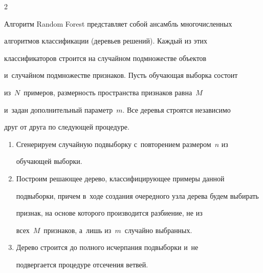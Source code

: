 \begin{multicols}{2}
\begin{itemize}
\end{itemize}

  

  Алгоритм Random Forest представляет собой ансамбль многочисленных 

алгоритмов классификации (деревьев решений). Каждый из этих 

классификаторов строится на случайном подмножестве объектов 

и~случайном подмножестве признаков. Пусть обучающая выборка состоит 

из~$N$~примеров, размерность пространства признаков равна~$M$ 

и~задан дополнительный параметр~$m$. Все деревья строятся независимо 

друг от друга по следующей процедуре.

  \begin{enumerate}[1.]

  \item Сгенерируем случайную подвыборку с~повторением размером~$n$ из 

обучающей выборки.

  \item Построим решающее дерево, классифицирующее примеры данной 

подвыборки, причем в~ходе создания очередного узла дерева будем выбирать 

признак, на основе которого производится разбиение, не из 

всех~$M$~признаков, а~лишь из~$m$~случайно выбранных.

  \item Дерево строится до полного исчерпания подвыборки и~не 

подвергается процедуре отсечения ветвей.

  \end{enumerate}

  

     \begin{table}[b]\small %

  \begin{center}


  \vspace*{2ex}

  

  \begin{tabular}{|l|l|c|c|c|c|}

  \hline


\end{tabular}
\end{center}
\end{table}
\end{multicols}
